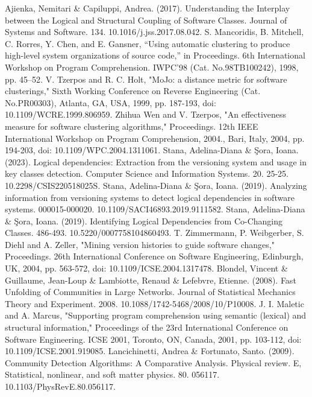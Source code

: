 \documentclass{ieeeaccess}
\begin{document}
\begin{thebibliography}{00}

 Ajienka, Nemitari \& Capiluppi, Andrea. (2017). Understanding the Interplay between the Logical and Structural Coupling of Software Classes. Journal of Systems and Software. 134. 10.1016/j.jss.2017.08.042.
 S. Mancoridis, B. Mitchell, C. Rorres, Y. Chen, and E. Gansner, “Using automatic clustering to produce high-level system organizations of source code,” in Proceedings. 6th International Workshop on Program Comprehension. IWPC’98 (Cat. No.98TB100242), 1998, pp. 45–52.
 V. Tzerpos and R. C. Holt, "MoJo: a distance metric for software clusterings," Sixth Working Conference on Reverse Engineering (Cat. No.PR00303), Atlanta, GA, USA, 1999, pp. 187-193, doi: 10.1109/WCRE.1999.806959.
 Zhihua Wen and V. Tzerpos, "An effectiveness measure for software clustering algorithms," Proceedings. 12th IEEE International Workshop on Program Comprehension, 2004., Bari, Italy, 2004, pp. 194-203, doi: 10.1109/WPC.2004.1311061.
 Stana, Adelina-Diana \& Şora, Ioana. (2023). Logical dependencies: Extraction from the versioning system and usage in key classes detection. Computer Science and Information Systems. 20. 25-25. 10.2298/CSIS220518025S. 
 Stana, Adelina-Diana \& Şora, Ioana. (2019). Analyzing information from versioning systems to detect logical dependencies in software systems. 000015-000020. 10.1109/SACI46893.2019.9111582. 
 Stana, Adelina-Diana \& Şora, Ioana. (2019). Identifying Logical Dependencies from Co-Changing Classes. 486-493. 10.5220/0007758104860493. 
 T. Zimmermann, P. Weibgerber, S. Diehl and A. Zeller, "Mining version histories to guide software changes," Proceedings. 26th International Conference on Software Engineering, Edinburgh, UK, 2004, pp. 563-572, doi: 10.1109/ICSE.2004.1317478.
 Blondel, Vincent \& Guillaume, Jean-Loup \& Lambiotte, Renaud \& Lefebvre, Etienne. (2008). Fast Unfolding of Communities in Large Networks. Journal of Statistical Mechanics Theory and Experiment. 2008. 10.1088/1742-5468/2008/10/P10008. 
 J. I. Maletic and A. Marcus, "Supporting program comprehension using semantic (lexical) and structural information," Proceedings of the 23rd International Conference on Software Engineering. ICSE 2001, Toronto, ON, Canada, 2001, pp. 103-112, doi: 10.1109/ICSE.2001.919085.
 Lancichinetti, Andrea \& Fortunato, Santo. (2009). Community Detection Algorithms: A Comparative Analysis. Physical review. E, Statistical, nonlinear, and soft matter physics. 80. 056117. 10.1103/PhysRevE.80.056117. 

\end{thebibliography}
\end{document}
